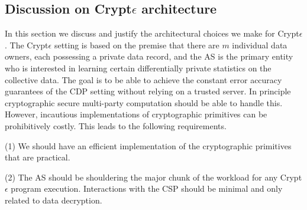 \subsection{Discussion on Crypt$\epsilon$ architecture}


In this section we discuss and justify the architectural choices we make for Crypt$\epsilon$. The Crypt$\epsilon$ setting is based on the premise that there are $m$ individual data owners, each possessing a private data record, and the \textsf{AS} is the primary entity who is interested in learning certain differentially private statistics on the collective data. The goal is to be able to achieve the constant error accuracy guarantees of the \textsf{CDP} setting without relying on a trusted server. In principle cryptographic secure multi-party computation should be able to handle this. However, incautious implementations of cryptographic primitives can be prohibitively costly. This leads to the following requirements.

(1) We should have an efficient implementation of the cryptographic primitives that are practical.

(2) The \textsf{AS} should be shouldering the major chunk of the workload for any Crypt$\epsilon$ program execution. Interactions with the \textsf{CSP} should be minimal and only related to data decryption.

